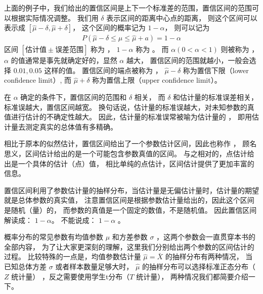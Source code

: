 \documentclass[letterpaper,10pt,english]{sphinxmanual}
\begin{document}
上面的例子中，我们给出的置信区间是上下一个标准差的范围，置信区间的范围可以根据实际情况调整。
我们用 \(\delta\) 表示区间的距离中心点的距离，
则这个区间可以表示成 \([\hat{\mu}-\delta,\hat{\mu}+\delta]\)，
这个区间的概率记为 \(1-\alpha\)，
则可以记为
\begin{equation}\label{equation:推断与检验/content:eq_estimator_eval_086}
\begin{split}P( \hat{\mu} - \delta \leq \mu \leq \hat{\mu}+a) = 1-\alpha\end{split}
\end{equation}
区间 \([\text{估计值} \pm \text{误差范围}]\) 称为 ，
\(1-\alpha\) 称为 。
而 \(\alpha(0<\alpha<1)\) 则被称为 ，
\(\alpha\) 的值通常是事先就确定好的，显然 \(\alpha\) 越大，
置信区间的范围就越小，一般会选择 \(0.01,0.05\) 这样的值。
置信区间的端点被称为 ，
\(\hat{\mu} - \delta\) 称为置信下限（lower confidence limit）,
而 \(\hat{\mu} + \delta\) 称为置信上限（upper confidence limit）。

在 \(\alpha\) 确定的条件下，置信区间的范围和 \(\delta\) 相关，
而 \(\delta\) 和估计量的标准误差相关，标准误越大，置信区间越宽。
换句话说，估计量的标准误越大，对未知参数的真值进行估计的不确定性越大。
因此，估计量的标准误常被喻为估计量的 ，
即用估计量去测定真实的总体值有多精确。

相比于原本的似然估计，置信区间给出了一个参数估计区间，因此也称作 ，
顾名思义，区间估计给出的是一个可能包含参数真值的区间。
与之相对的，点估计给出是一个具体的估计（点）值，
相比单纯的点估计，区间估计提供了更加丰富的信息。

置信区间利用了参数估计量的抽样分布，当估计量是无偏估计量时，估计量的期望就是总体参数的真实值，
注意置信区间是根据参数估计量给出的，因此这个区间是随机（量）的，
而参数的真值是一个固定的数值，不是随机值。
因此置信区间解读成： \(1-\alpha\)。
不能说成：  \(1-\alpha\) 。

概率分布的常见参数有均值参数 \(\mu\) 和方差参数 \(\sigma\)
，这两个参数会一直贯穿本书的全部内容，
为了让大家更深刻的理解，这里我们分别给出两个参数的区间估计的过程。
比较特殊的一点是，均值参数估计量 \(\hat{\mu}=\bar{X}\)
的抽样分布有两种情况，
当已知总体方差 \(\sigma\) 或者样本数量足够大时，
\(\hat{\mu}\)  的抽样分布可以选择标准正态分布（ \(Z\) 统计量）
，反之需要使用学生t分布（\(T\) 统计量），
两种情况我们都简要介绍一下。
\end{document}
